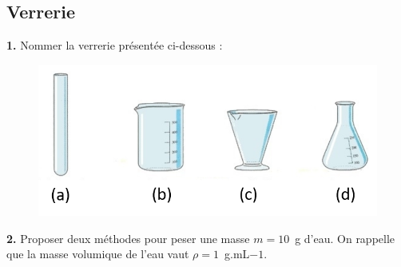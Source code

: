 \subsection{Verrerie}
\textbf{1.} Nommer la verrerie présentée ci-dessous :
\begin{figure}[!h]
    \centering
    \includegraphics[scale=0.4]{Revision/Verrerie1.png}
\end{figure}

\textbf{2.} Proposer deux méthodes pour peser une masse $m=10$~g d'eau. On rappelle que la masse volumique de l'eau vaut $\rho=1$~g.mL${-1}$.